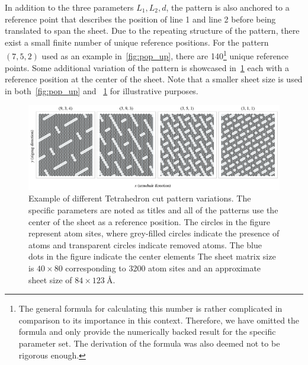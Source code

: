 In addition to the three parameters $L_1, L_2, d$, the pattern is also anchored
to a reference point that describes the position of line 1 and line 2 before
being translated to span the sheet. Due to the repeating structure of the
pattern, there exist a small finite number of unique reference positions. For
the pattern $(7, 5, 2)$ used as an example in~\cref{fig:pop_up}, there are
140\footnote{The general formula for calculating this number is rather
complicated in comparison to its importance in this context. Therefore, we have
omitted the formula and only provide the numerically backed result for the
specific parameter set. The derivation of the formula was also deemed not to be
rigorous enough.} unique reference points. Some additional variation of the
pattern is showcased in~\cref{fig:pop_up_flavors} each with a reference position
at the center of the sheet. Note that a smaller sheet size is used in
both~\cref{fig:pop_up} and ~\cref{fig:pop_up_flavors} for illustrative purposes.

\begin{figure}[H]
  \centering
  \includegraphics[width=\linewidth]{figures/system/pop_up_flavors.pdf}
  \caption{Example of different Tetrahedron cut pattern variations. The specific parameters are noted as titles and all of the patterns use the center of the sheet as a reference position. The circles in the figure represent atom sites, where grey-filled circles indicate the presence of atoms and transparent circles indicate removed atoms. The blue dots in the figure indicate the center elements The sheet matrix size is $40 \times 80$ corresponding to 3200 atom sites and an approximate sheet size of $84 \times \SI{123}{\text{Å}}$.}
  \label{fig:pop_up_flavors}
\end{figure}



